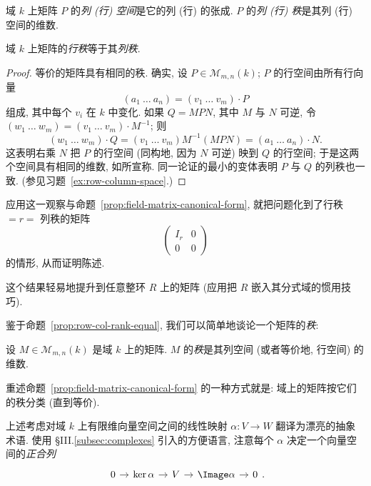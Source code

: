 域 $k$ 上矩阵 $P$ 的\emph{列 (行) 空间}是它的列 (行) 的张成. $P$ 的\emph{列 (行) 秩}是其列 (行) 空间的维数.

\begin{proposition}\label{prop:row-col-rank-equal}
域 $k$ 上矩阵的\emph{行秩}等于其\emph{列秩}.
\end{proposition}

\begin{proof}
等价的矩阵具有相同的秩. 确实, 设 $P\in\mathcal{M}_{m,n}(k)$; $P$ 的行空间由所有行向量
\[
(a_1\ \dots\ a_n)=(v_1\ \dots\ v_m)\cdot P
\]
组成, 其中每个 $v_i$ 在 $k$ 中变化. 如果 $Q=MPN$, 其中 $M$ 与 $N$ 可逆, 令 $(w_1\ \dots\ w_m)=(v_1\ \dots\ v_m)\cdot M^{-1}$; 则
\[
(w_1\ \dots\ w_m)\cdot Q=(v_1\ \dots\ v_m)M^{-1}(MPN)=(a_1\ \dots\ a_n)\cdot N.
\]
这表明右乘 $N$ 把 $P$ 的行空间 (同构地, 因为 $N$ 可逆) 映到 $Q$ 的行空间; 于是这两个空间具有相同的维数, 如所宣称. 同一论证的最小的变体表明 $P$ 与 $Q$ 的列秩也一致. (参见习题~\ref{ex:row-column-space}.)
\end{proof}

应用这一观察与命题~\ref{prop:field-matrix-canonical-form}, 就把问题化到了行秩 $=r=$ 列秩的矩阵
\[
\begin{pmatrix} I_r&0\\ \hline 0&0\end{pmatrix}
\]
的情形, 从而证明陈述.

这个结果轻易地提升到任意整环 $R$ 上的矩阵 (应用把 $R$ 嵌入其分式域的惯用技巧).

鉴于命题~\ref{prop:row-col-rank-equal}, 我们可以简单地谈论一个矩阵的\emph{秩}:

\begin{definition}\label{def:rank-matrix}
设 $M\in\mathcal{M}_{m,n}(k)$ 是域 $k$ 上的矩阵. $M$ 的\emph{秩}是其列空间 (或者等价地, 行空间) 的维数.
\end{definition}

重述命题~\ref{prop:field-matrix-canonical-form} 的一种方式就是: 域上的矩阵按它们的秩分类 (直到等价).

上述考虑对域 $k$ 上有限维向量空间之间的线性映射 $\alpha:V\to W$ 翻译为漂亮的抽象术语. 使用 §III.\ref{subsec:complexes} 引入的方便语言, 注意每个 $\alpha$ 决定一个向量空间的\emph{正合列}
\[
\begin{tikzcd}[column sep=.9em]
0 \ar[r] & \ker\alpha \ar[r] & V \ar[r] & \Image\alpha \ar[r] & 0
\end{tikzcd}.
\]


